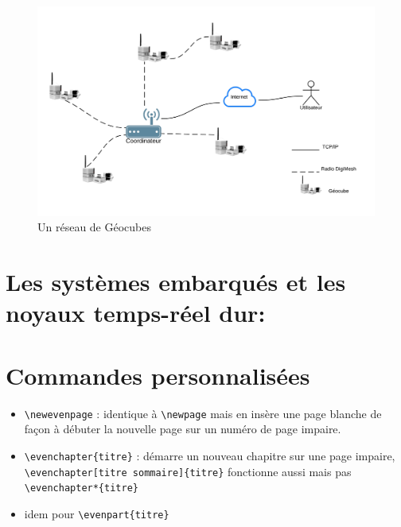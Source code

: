 \documentclass{themeensg}
\newcommand{\ensg}{\textsc{Ensg}}
\begin{document}
\begin{figure}[h!]
\centering
\includegraphics[scale=0.8]{images/fig1.png}
\caption{Un réseau de Géocubes}
\label{fig:geocube_network}
\end{figure}

\section{Les systèmes embarqués et les noyaux temps-réel dur:}

\section{Commandes personnalisées}

\begin{itemize}
\item \verb!\newevenpage! : identique à \verb!\newpage! mais en insère une page blanche de façon à débuter la nouvelle page sur un numéro de page impaire.
\item \verb!\evenchapter{titre}! : démarre un nouveau chapitre sur une page impaire,\\ \verb!\evenchapter[titre sommaire]{titre}! fonctionne aussi mais pas \verb!\evenchapter*{titre}!
\item idem pour \verb!\evenpart{titre}!
\end{itemize}
\end{document}

